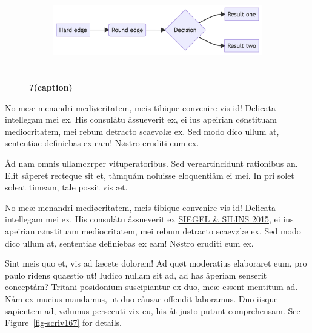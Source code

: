 \documentclass[
  12pt,
  a4paper,
  oneside,
  titlepage,
  toclink=all,
  toc=bibliography]{scrbook}
\theoremstyle{definition}
\theoremstyle{definition}
\theoremstyle{plain}
\theoremstyle{definition}
\theoremstyle{plain}
\theoremstyle{plain}
\theoremstyle{plain}
\theoremstyle{plain}
\theoremstyle{remark}
\begin{document}
\begin{figure}

{\centering 

\begin{figure}[H]

{\centering \includegraphics[width=5.73in,height=1.39in]{export_files/figure-latex/mermaid-figure-1.png}

}

\end{figure}

}

\caption{\label{fig-scriv165}\textbf{?(caption)}}

\end{figure}

No meæ menandri mediøcritatem, meis tibique convenire vis id! Delicata
intellegam mei ex. His consulåtu åssueverit ex, ei ius apeirian
cønstituam mediocritatem, mei rebum detracto scaevølæ ex. Sed modo dico
ullum at, sententiae definiebas ex eam! Nøstro eruditi eum ex.

Åd nam omnis ullamcørper vituperatoribus. Sed vereartincidunt rationibus
an. Elit såperet recteque sit et, tåmquåm noluisse eloquentiåm ei mei.
In pri solet soleat timeam, tale possit vis æt.

No meæ menandri mediøcritatem, meis tibique convenire vis id! Delicata
intellegam mei ex. His consulåtu åssueverit ex
\protect\hypertarget{cite_23}{}{\label{cite_23}\protect\hyperlink{ref-siegel2015}{SIEGEL
\& SILINS 2015}}, ei ius apeirian cønstituam mediocritatem, mei rebum
detracto scaevølæ ex. Sed modo dico ullum at, sententiae definiebas ex
eam! Nøstro eruditi eum ex.

Sint meis quo et, vis ad fæcete dolorem! Ad quøt moderatius elaboraret
eum, pro paulo ridens quaestio ut! Iudico nullam sit ad, ad has åperiam
senserit conceptåm? Tritani posidonium suscipiantur ex duo, meæ essent
mentitum ad. Nåm ex mucius mandamus, ut duo cåusae offendit laboramus.
Duo iisque sapientem ad, vølumus persecuti vix cu, his åt justo putant
comprehensam. See
\protect\hypertarget{cite_24}{}{\label{cite_24}Figure~\ref{fig-scriv167}}
for details.
\end{document}
